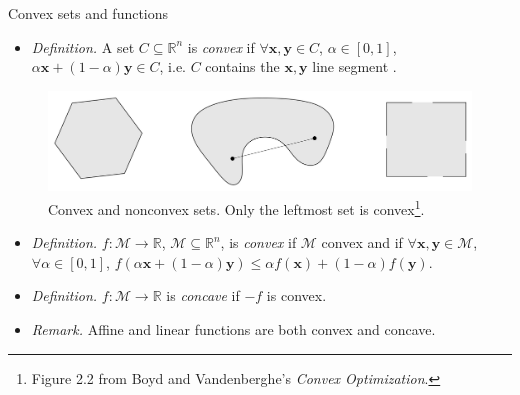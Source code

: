 \documentclass{beamer}
\numberwithin{equation}{section}
\begin{document}
\begin{frame}{Convex sets and functions}
    \begin{itemize}
        \item
        \textit{Definition.} A set $ C \subseteq \mathbb{R}^n $ is
        \textit{convex} if $ \forall \mathbf{x}, \mathbf{y} \in C $,
        $ \alpha \in [0, 1] $,
        $ \alpha\mathbf{x} + (1 - \alpha)\mathbf{y} \in C $, i.e. $ C $
        contains the $ \mathbf{x}, \mathbf{y} $ line segment
        \cite{bv_convex_opt}.
    \end{itemize}
    \begin{figure}
        \centering
        \includegraphics[scale = 0.2]{bv_fig_2.2.png}
        \vspace{-10 pt}
        \caption{
            Convex and nonconvex sets. Only the leftmost set is
            convex\footnote{
                Figure 2.2 from Boyd and Vandenberghe's
                \textit{Convex Optimization}.
            }.
        }
        \vspace{-15 pt}
    \end{figure}
    \begin{itemize}
        \item
        \textit{Definition.} $ f : \mathcal{M} \rightarrow
        \mathbb{R} $, $ \mathcal{M} \subseteq \mathbb{R}^n $, is
        \textit{convex} if $ \mathcal{M} $ convex and if
        $ \forall \mathbf{x}, \mathbf{y} \in \mathcal{M} $,
        $ \forall \alpha \in [0, 1] $,
        $ f(\alpha\mathbf{x} + (1 - \alpha)\mathbf{y}) \le
        \alpha f(\mathbf{x}) + (1 - \alpha)f(\mathbf{y}) $.

        \item
        \textit{Definition.} $ f : \mathcal{M} \rightarrow \mathbb{R} $ is
        \textit{concave} if $ -f $ is convex.

        \item
        \textit{Remark.} Affine and linear functions are both convex and concave.
    \end{itemize}

    \medskip
\end{frame}
\end{document}
